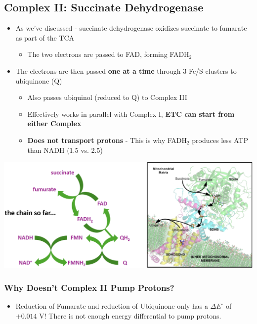 \documentclass[10pt]{article}
\begin{document}
\subsection*{Complex II: Succinate Dehydrogenase}
\begin{itemize}
	\item As we've discussed - succinate dehydrogenase oxidizes succinate to fumarate as part of the TCA
	\begin{itemize}
        \item The two electrons are passed to FAD, forming FADH$_2$
    \end{itemize}
    \item The electrons are then passed \textbf{one at a time} through 3 Fe/S clusters to ubiquinone (Q)
    \begin{itemize}
        \item Also passes ubiquinol (reduced to Q) to Complex III
        \item Effectively works in parallel with Complex I, \textbf{ETC can start from either Complex}
        \item \textbf{Does not transport protons} - This is why FADH$_2$ produces less ATP than NADH (1.5 vs. 2.5)
    \end{itemize}
\end{itemize}
\begin{center} 
	\includegraphics*[width=\textwidth]{L2_10.png}
\end{center}

\subsubsection*{Why Doesn't Complex II Pump Protons?}
\begin{itemize}
	\item Reduction of Fumarate and reduction of Ubiquinone only has a $\Delta E^\circ$ of $+0.014$ V!  There is not enough energy differential to pump protons.
\end{itemize}
\end{document}
